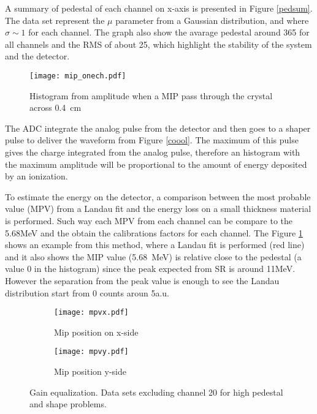 A summary of pedestal of each channel on x-axis is presented in Figure \ref{pedsum}. The data set represent the $\mu$
parameter from a Gaussian distribution, and where $\sigma\sim 1$ for each channel. The graph also show the avarage
pedestal around 365 for all channels and the RMS of about 25, which highlight the stability of the system and the detector.\par

\begin{figure}[ht]
	\hspace*{\fill}
	\centering
	\texttt{[image: mip\_onech.pdf]}
	\hspace*{\fill}
	\caption{Histogram from amplitude when a MIP pass through the crystal across \SI{0.4}{cm}}\label{landau}
\end{figure}

The ADC integrate the analog pulse from the detector and then goes to a shaper pulse to deliver the waveform from Figure
\ref{coool}. The maximum of this pulse gives the charge integrated from the analog pulse, therefore an histogram with
the maximum amplitude will be proportional to the amount of energy deposited by an ionization. \par To estimate the
energy on the detector, a comparison between the most probable value (MPV) from a Landau fit and the energy loss on a
small thickness material is performed. Such way each MPV from each channel can be compare to the 5.68MeV and the obtain
the calibrations factors for each channel. The Figure \ref{landau} shows an example from this method, where a Landau fit
is performed (red line) and it also shows the MIP value (\SI{5.68}{MeV}) is relative close to the pedestal (a value 0 in the
histogram) since the peak expected from SR is around 11MeV. However the separation from the peak value is enough to see
the Landau distribution start from 0 counts aroun 5a.u.\par


\begin{figure}[ht]
	\hspace*{\fill}
	\centering
		\begin{subfigure}[b]{0.45\textwidth}
			\texttt{[image: mpvx.pdf]}
			\caption{Mip position on x-side}\label{gainx}
		\end{subfigure}
		\hfill
		\begin{subfigure}[b]{0.45\textwidth}
			\texttt{[image: mpvy.pdf]}
			\caption{Mip position y-side}\label{gainy}
		\end{subfigure}
\hspace*{\fill}
	\caption{Gain equalization. Data sets excluding channel 20 for high pedestal and shape problems.}\label{equalization}
\end{figure}

